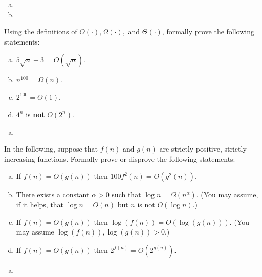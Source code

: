 \documentclass{article}
\begin{document}
\begin{solution}
	\begin{mdframed}
	\begin{enumerate}[(a)]
	\item 
	\item %
	\end{enumerate}
	\end{mdframed}
\end{solution}

\begin{exercise}[subtitle={Basic Big-O (4 pts)}]
Using the definitions of $O(\cdot),\Omega(\cdot),$ and $\Theta(\cdot)$, formally prove the following statements:
\begin{enumerate}[(a)]
	\item $5 \sqrt{n} + 3 = O(\sqrt{n})$.
	\item $n^{100} = \Omega(n)$.
	\item $2^{100} = \Theta(1)$.
	\item $4^n$ is \textbf{not} $O(2^n)$.
\end{enumerate}
\end{exercise}
\begin{solution}
	\begin{mdframed}
	\begin{enumerate}[(a)]
	\item 
	\end{enumerate}
	\end{mdframed}
\end{solution}

\begin{exercise}[subtitle={More Big-O: True or False? (8 pts)}]
In the following, suppose that $f(n)$ and $g(n)$ are strictly positive, strictly increasing functions. Formally prove or disprove the following statements:
\begin{enumerate}[(a)]
\item If $f(n) = O(g(n))$ then $100 f^2(n) = O(g^2(n))$.
\item There exists a constant $\alpha > 0$ such that $\log n = \Omega(n^{\alpha})$. (You may assume, if it helps, that $\log n = O(n)$ but $n$ is not $O(\log n)$.)
\item If $f(n) = O(g(n))$ then $\log(f(n)) = O(\log(g(n)))$. (You may assume $\log(f(n)),\log(g(n)) > 0$.)
\item If $f(n) = O(g(n))$ then $2^{f(n)} = O(2^{g(n)})$.
\end{enumerate}
\end{exercise}
\begin{solution}
	\begin{mdframed}
	\begin{enumerate}[(a)]
	\item 
	\end{enumerate}
	\end{mdframed}
\end{solution}
\end{document}
